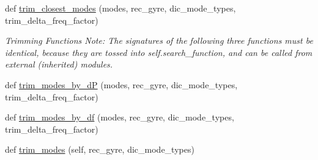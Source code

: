 \begin{DoxyCompactItemize}
\item 
def \hyperlink{classasamba_1_1sampler_1_1sampling_a75e186291813796d1114ccf2e1f3b2c3}{trim\+\_\+closest\+\_\+modes} (modes, rec\+\_\+gyre, dic\+\_\+mode\+\_\+types, trim\+\_\+delta\+\_\+freq\+\_\+factor)
\begin{DoxyCompactList}\small\item\em Trimming Functions Note\+: The signatures of the following three functions must be identical, because they are tossed into self.\+search\+\_\+function, and can be called from external (inherited) modules. \end{DoxyCompactList}\item 
def \hyperlink{classasamba_1_1sampler_1_1sampling_a8058c0e4f2aa8642f7b19daeb016d73a}{trim\+\_\+modes\+\_\+by\+\_\+dP} (modes, rec\+\_\+gyre, dic\+\_\+mode\+\_\+types, trim\+\_\+delta\+\_\+freq\+\_\+factor)
\item 
def \hyperlink{classasamba_1_1sampler_1_1sampling_a0fe5ca163f5e1c07a017783818535579}{trim\+\_\+modes\+\_\+by\+\_\+df} (modes, rec\+\_\+gyre, dic\+\_\+mode\+\_\+types, trim\+\_\+delta\+\_\+freq\+\_\+factor)
\item 
def \hyperlink{classasamba_1_1sampler_1_1sampling_ad67c8918488194428f7733918a55a4a0}{trim\+\_\+modes} (self, rec\+\_\+gyre, dic\+\_\+mode\+\_\+types)
\end{DoxyCompactItemize}
